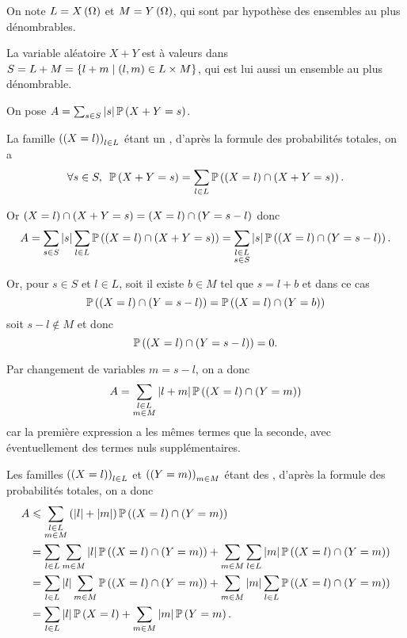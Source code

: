 \begin{dem}
On note \(L=X\left(\Omega\right)\) et \(M=Y\left(\Omega\right)\), qui sont par hypothèse des ensembles au plus dénombrables.

La variable aléatoire \(X+Y\) est à valeurs dans \(S=L+M=\left\lbrace l+m\;\middle|\;\left(l,m\right)\in L\times M\right\rbrace\), qui est lui aussi un ensemble au plus dénombrable.

On pose \(A=\sum_{s\in S}\left\lvert s\right\rvert\mathbb{P}\left(X+Y=s\right)\).

La famille \(\left(\left(X=l\right)\right)_{l\in L}\) étant un \sce, d'après la formule des probabilités totales, on a \[\quantifs{\forall s\in S}\proba{X+Y=s}=\sum_{l\in L}\proba{\paren{X=l}\inter\paren{X+Y=s}}.\]

Or \(\left(X=l\right)\cap\left(X+Y=s\right)=\left(X=l\right)\cap\left(Y=s-l\right)\) donc \[A=\sum_{s\in S}\left\lvert s\right\rvert\sum_{l\in L}\mathbb{P}\left(\left(X=l\right)\cap\left(X+Y=s\right)\right)=\sum_{\substack{l\in L \\ s\in S}}\left\lvert s\right\rvert\mathbb{P}\left(\left(X=l\right)\cap\left(Y=s-l\right)\right).\]

Or, pour \(s\in S\) et \(l\in L\), soit il existe \(b\in M\) tel que \(s=l+b\) et dans ce cas \[\mathbb{P}\left(\left(X=l\right)\cap\left(Y=s-l\right)\right)=\mathbb{P}\left(\left(X=l\right)\cap\left(Y=b\right)\right)\] soit \(s-l\not\in M\) et donc \[\mathbb{P}\left(\left(X=l\right)\cap\left(Y=s-l\right)\right)=0.\]

Par changement de variables \(m=s-l\), on a donc \[A=\sum_{\substack{l\in L \\ m\in M}}\left\lvert l+m\right\rvert\mathbb{P}\left(\left(X=l\right)\cap\left(Y=m\right)\right)\] car la première expression a les mêmes termes que la seconde, avec éventuellement des termes nuls supplémentaires.

Les familles \(\left(\left(X=l\right)\right)_{l\in L}\) et \(\left(\left(Y=m\right)\right)_{m\in M}\) étant des \sce, d'après la formule des probabilités totales, on a donc \[\begin{aligned}
A&\leqslant\sum_{\substack{l\in L \\ m\in M}}\left(\left\lvert l\right\rvert+\left\lvert m\right\rvert\right)\mathbb{P}\left(\left(X=l\right)\cap\left(Y=m\right)\right) \\
&=\sum_{l\in L}\sum_{m\in M}\left\lvert l\right\rvert\mathbb{P}\left(\left(X=l\right)\cap\left(Y=m\right)\right)+\sum_{m\in M}\sum_{l\in L}\left\lvert m\right\rvert\mathbb{P}\left(\left(X=l\right)\cap\left(Y=m\right)\right) \\
&=\sum_{l\in L}\left\lvert l\right\rvert\sum_{m\in M}\mathbb{P}\left(\left(X=l\right)\cap\left(Y=m\right)\right)+\sum_{m\in M}\left\lvert m\right\rvert\sum_{l\in L}\mathbb{P}\left(\left(X=l\right)\cap\left(Y=m\right)\right) \\
&=\sum_{l\in L}\left\lvert l\right\rvert\mathbb{P}\left(X=l\right)+\sum_{m\in M}\left\lvert m\right\rvert\mathbb{P}\left(Y=m\right).
\end{aligned}\]


\end{dem}
